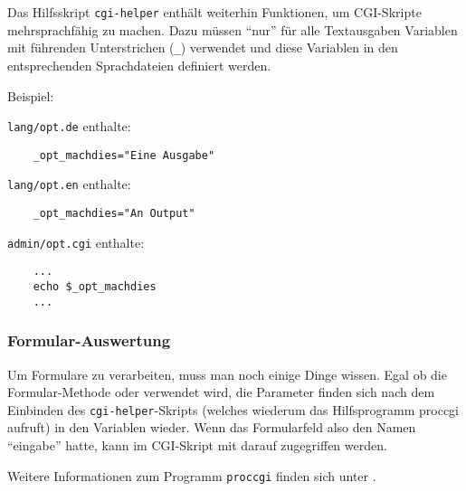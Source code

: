 Das Hilfsskript \texttt{cgi-helper} enthält weiterhin Funktionen, um CGI-Skripte
mehrsprachfähig zu machen. Dazu müssen "`nur"' für alle Textausgaben Variablen
mit führenden Unterstrichen (\texttt{\_}) verwendet und diese Variablen in den
entsprechenden Sprachdateien definiert werden.

Beispiel:

\texttt{lang/opt.de} enthalte:

\begin{example}
\begin{verbatim}
    _opt_machdies="Eine Ausgabe"
\end{verbatim}
\end{example}

\texttt{lang/opt.en} enthalte:

\begin{example}
\begin{verbatim}
    _opt_machdies="An Output"
\end{verbatim}
\end{example}

\texttt{admin/opt.cgi} enthalte:

\begin{example}
\begin{verbatim}
    ...
    echo $_opt_machdies
    ...
\end{verbatim}
\end{example}


\subsubsection{Formular-Auswertung}

Um Formulare zu verarbeiten, muss man noch einige Dinge wissen. Egal ob die
Formular-Methode  oder  verwendet wird, die Parameter finden
sich nach dem Einbinden des \texttt{cgi-helper}-Skripts (welches wiederum das
Hilfsprogramm proccgi aufruft) in den Variablen  wieder.
Wenn das Formularfeld also den Namen "`eingabe"' hatte, kann im CGI-Skript
mit  darauf zugegriffen werden.

Weitere Informationen zum Programm \texttt{proccgi} finden sich unter
.


